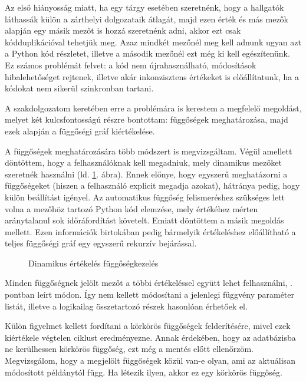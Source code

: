 Az első hiányosság miatt, ha egy tárgy esetében szeretnénk, hogy a hallgatók láthassák külön a zárthelyi dolgozataik átlagát, majd ezen érték és más mezők alapján egy másik mezőt is hozzá szeretnénk adni, akkor ezt csak kódduplikációval tehetjük meg. Azaz mindkét mezőnél meg kell adnunk ugyan azt a Python kód részletet, illetve a második mezőnél ezt még ki kell egészítenünk. Ez számos problémát felvet: a kód nem újrahasználható, módosítások hibalehetőséget rejtenek, illetve akár inkonzisztens értékeket is előállítatunk, ha a kódokat nem sikerül szinkronban tartani.

A szakdolgozatom keretében erre a problémára is kerestem a megfelelő megoldást, melyet két kulcsfontosságú részre bontottam: függőségek meghatározása, majd ezek alapján a függőségi gráf kiértékelése.

A függőségek meghatározására több módszert is megvizsgáltam. Végül amellett döntöttem, hogy a felhasználóknak kell megadniuk, mely dinamikus mezőket szeretnék használni (ld. \ref{fig:jporta_dynamic_dependencies}. ábra). Ennek előnye, hogy egyszerű meghatázorni a függőségeket (hiszen a felhasználó explicit megadja azokat), hátránya pedig, hogy külön beállítást igényel. Az automatikus függőség felismeréshez szükséges lett volna a mezőhöz tartozó Python kód elemzése, mely értékéhez mérten aránytalanul sok időráfordítást követelt. Emiatt döntöttem a másik megoldás mellett. Ezen információk birtokában pedig bármelyik értékeléshez előállítható a teljes függőségi gráf egy egyszerű rekurzív bejárással.

\begin{figure}[h]
    \centering
    \caption{Dinamikus értékelés függőségkezelés}
    \label{fig:jporta_dynamic_dependencies}
\end{figure}

Minden függőségnek jelölt mezőt a többi értékeléssel együtt lehet felhasználni, . pontban leírt módon. Így nem kellett módosítani a jelenlegi függvény paraméter listát, illetve a logikailag összetartozó részek hasonlóan érhetőek el.

Külön figyelmet kellett fordítani a körkörös függőségek felderítésére, mivel ezek kiértékele végtelen ciklust eredményezne. Annak érdekében, hogy az adatbázisba ne kerülhessen körkörös függőség, ezt még a mentés előtt ellenőrzöm. Megvizsgálom, hogy a megjelölt függőségek közül van-e olyan, ami az aktuálisan módosított példánytól függ. Ha létezik ilyen, akkor ez egy körkörös függőség.


